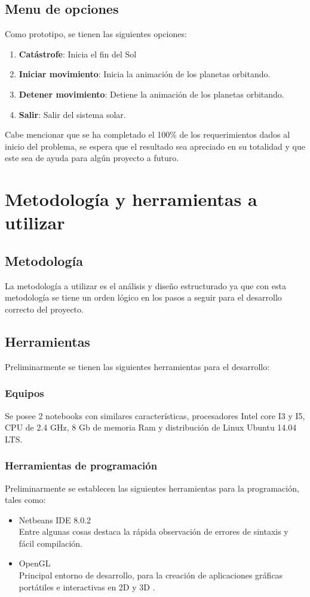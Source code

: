 \documentclass[12pt,journal,compsoc]{IEEEtran}
\begin{document}
\subsection{Menu de opciones}

Como prototipo, se tienen las siguientes opciones:

\begin{enumerate}
	\item \textbf{Catástrofe}: Inicia el fin del Sol
	\item \textbf{Iniciar movimiento}: Inicia la animación de los planetas orbitando.
	\item \textbf{Detener movimiento}: Detiene la animación de los planetas orbitando.
	\item \textbf{Salir}: Salir del sistema solar.
\end{enumerate}
Cabe mencionar que se ha completado el 100\% de los requerimientos dados al inicio del problema, se espera que el resultado sea apreciado en su totalidad y que este sea de ayuda para algún proyecto a futuro.
\section{Metodología y herramientas a utilizar}
\subsection{Metodología}
La metodología a utilizar es el análisis y diseño estructurado ya que con esta metodología se tiene un orden lógico en los pasos a seguir para el desarrollo correcto del proyecto.
\subsection{Herramientas}
Preliminarmente se tienen las siguientes herramientas para el desarrollo:
\subsubsection{Equipos}
Se posee 2 notebooks con similares características, procesadores Intel core I3 y I5, CPU de 2.4 GHz, 8 Gb de memoria Ram y distribución de Linux Ubuntu 14.04 LTS.
\subsubsection{Herramientas de programación}
Preliminarmente se establecen las siguientes herramientas para la programación, tales como:
\begin{itemize}
 \item Netbeans IDE 8.0.2\\
 	Entre algunas cosas destaca la rápida observación de errores de sintaxis y fácil compilación.
 \item OpenGL\\
 	Principal entorno de desarrollo, para la creación de aplicaciones gráficas portátiles e interactivas en
 	2D y 3D \cite{opengl}.
\end{itemize}
\end{document}

